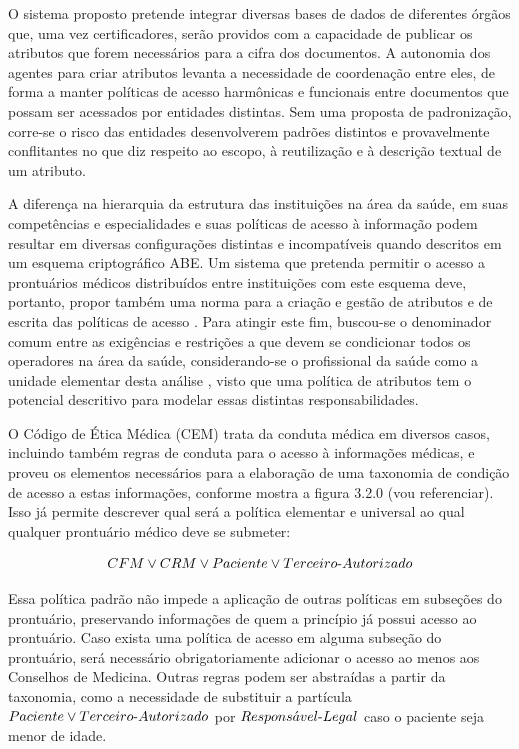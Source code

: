 \documentclass[a4paper,11pt]{article}
\begin{document}
O sistema proposto pretende integrar diversas bases de dados de diferentes órgãos que, uma vez  certificadores, serão providos com a capacidade de publicar os atributos que forem necessários para a cifra dos documentos. A autonomia dos agentes para criar atributos levanta a necessidade de coordenação entre eles, de forma a manter políticas de acesso harmônicas e funcionais entre documentos que possam ser acessados por entidades distintas. Sem uma proposta de padronização, corre-se o risco das entidades desenvolverem padrões distintos e provavelmente conflitantes no que diz respeito ao escopo, à reutilização e à descrição textual de um atributo.   

A diferença na hierarquia da estrutura das instituições na área da saúde, em suas competências e especialidades e suas políticas de acesso à informação podem resultar em diversas configurações distintas e incompatíveis quando descritos em um esquema criptográfico ABE. Um sistema que pretenda permitir o acesso a prontuários médicos distribuídos entre instituições com este esquema deve, portanto, propor também uma norma para a criação e gestão de atributos e de escrita das políticas de acesso . Para atingir este fim, buscou-se o denominador comum entre as exigências e restrições a que devem se condicionar todos os operadores na área da saúde, considerando-se o profissional da saúde como a unidade elementar desta análise , visto que uma política de atributos tem o potencial descritivo para modelar essas distintas responsabilidades. 

O Código de Ética Médica (CEM) trata da conduta médica em diversos casos, incluindo também regras de conduta para o acesso à informações médicas, e proveu os elementos necessários para a elaboração de uma taxonomia de condição de acesso a estas informações, conforme mostra a figura 3.2.0 {\color{RoyalBlue}(vou referenciar)}. Isso já permite descrever qual será a política elementar e universal ao qual qualquer prontuário médico deve se submeter:  

\[ CFM \vee CRM \vee Paciente \vee Terceiro\textnormal{-}Autorizado \]

Essa política padrão não impede a aplicação de outras políticas em subseções do prontuário, preservando informações de quem a princípio já possui acesso ao prontuário. Caso exista uma política de acesso em alguma subseção do prontuário, será necessário obrigatoriamente adicionar o acesso ao menos aos Conselhos de Medicina. Outras regras podem ser abstraídas a partir da taxonomia, como a necessidade de substituir a partícula $Paciente \vee Terceiro\textnormal{-}Autorizado$ por $Respons\acute{a}vel\textnormal{-}Legal$ caso o paciente seja menor de idade. 
\end{document}
